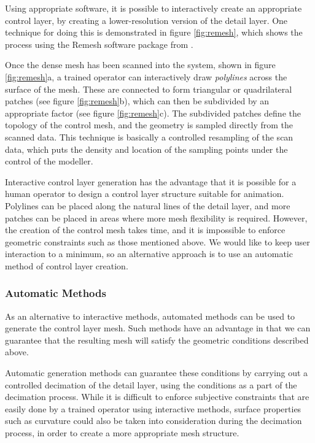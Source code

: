 Using appropriate software, it is possible to interactively create an appropriate control layer, by creating a lower-resolution version of the detail layer. One technique for doing this is demonstrated in figure \ref{fig:remesh}, which shows the process using the Remesh software package from \citet{3DScanners}. 

Once the dense mesh has been scanned into the system, shown in figure \ref{fig:remesh}a, a trained operator can interactively draw {\it polylines} across the surface of the mesh. These are connected to form triangular or quadrilateral patches (see figure \ref{fig:remesh}b), which can then be subdivided by an appropriate factor (see figure \ref{fig:remesh}c). The subdivided patches define the topology of the control mesh, and the geometry is sampled directly from the scanned data. This technique is basically a controlled resampling of the scan data,  which puts the density and location of the sampling points under the control of the modeller.

Interactive control layer generation has the advantage that it is possible for a human operator to design a control layer structure suitable for animation. Polylines can be placed along the natural lines of the detail layer, and more patches can be placed in areas where more mesh flexibility is required. However, the creation of the control mesh takes time, and it is impossible to enforce geometric constraints such as those mentioned above. We would like to keep user interaction to a minimum, so an alternative approach is to use an automatic method of control layer creation.

\subsubsection{\label{sec:scandata:creation:control:automatic}Automatic Methods}

As an alternative to interactive methods, automated methods can be used to generate the control layer mesh. Such methods have an advantage in that we can guarantee that the resulting mesh will satisfy the geometric conditions described above.

Automatic generation methods can guarantee these conditions by carrying out a controlled decimation of the detail layer, using the conditions as a part of the decimation process. While it is difficult to enforce subjective constraints that are easily done by a trained operator using interactive methods, surface properties such as curvature could also be taken into consideration during the decimation process, in order to create a more appropriate mesh structure.

